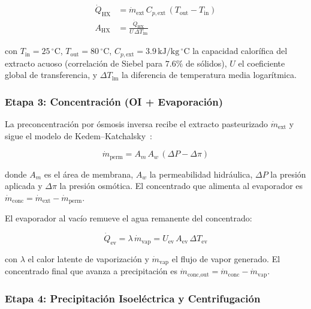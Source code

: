 \documentclass[10pt,letterpaper,twocolumn]{article}
\begin{document}
\begin{align}
\dot{Q}_{\text{HX}} &= \dot{m}_{\text{ext}} \, C_{p,\text{ext}} \, (T_{\text{out}} - T_{\text{in}}) \label{eq:stage2_energy} \\
A_{\text{HX}} &= \frac{\dot{Q}_{\text{HX}}}{U \, \Delta T_{\text{lm}}} \label{eq:stage2_area}
\end{align}

con $T_{\text{in}} = 25\,^\circ\text{C}$, $T_{\text{out}} = 80\,^\circ\text{C}$, $C_{p,\text{ext}} = 3.9\,\text{kJ/kg}\,^\circ\text{C}$ la capacidad calor\'ifica del extracto acuoso (correlaci\'on de Siebel para $7.6\%$ de s\'olidos), $U$ el coeficiente global de transferencia, y $\Delta T_{\text{lm}}$ la diferencia de temperatura media logar\'itmica.

\subsubsection{Etapa 3: Concentraci\'on (OI + Evaporaci\'on)}

La preconcentraci\'on por \'osmosis inversa recibe el extracto pasteurizado $\dot{m}_{\text{ext}}$ y sigue el modelo de Kedem--Katchalsky~\cite{kedem1958}:

\begin{equation}
\dot{m}_{\text{perm}} = A_m \, A_w \, (\Delta P - \Delta\pi) \label{eq:stage3_ro}
\end{equation}

donde $A_m$ es el \'area de membrana, $A_w$ la permeabilidad hidr\'aulica, $\Delta P$ la presi\'on aplicada y $\Delta\pi$ la presi\'on osm\'otica. El concentrado que alimenta al evaporador es $\dot{m}_{\text{conc}} = \dot{m}_{\text{ext}} - \dot{m}_{\text{perm}}$.

El evaporador al vac\'io remueve el agua remanente del concentrado:

\begin{equation}
\dot{Q}_{\text{ev}} = \lambda \, \dot{m}_{\text{vap}} = U_{\text{ev}} \, A_{\text{ev}} \, \Delta T_{\text{ev}} \label{eq:stage3_evap}
\end{equation}

con $\lambda$ el calor latente de vaporizaci\'on y $\dot{m}_{\text{vap}}$ el flujo de vapor generado. El concentrado final que avanza a precipitaci\'on es $\dot{m}_{\text{conc,out}} = \dot{m}_{\text{conc}} - \dot{m}_{\text{vap}}$.

\subsubsection{Etapa 4: Precipitaci\'on Isoel\'ectrica y Centrifugaci\'on}
\end{document}

